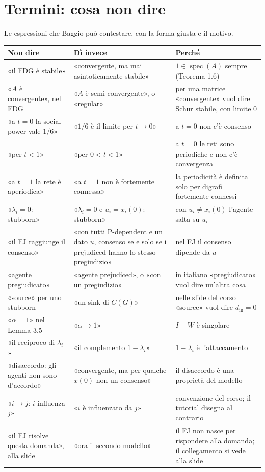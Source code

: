 \documentclass[a4paper,10pt]{article}
\newcommand{\fr}[1]{\getrefnumber{P-#1}}      %
\begin{document}
\section*{Termini: cosa non dire}

Le espressioni che Baggio può contestare, con la forma giusta e il motivo.

\smallskip
{\small
\begin{tabularx}{\textwidth}{>{\raggedright\arraybackslash}p{}>{\raggedright\arraybackslash}p{}>{\raggedright\arraybackslash}X}
  \toprule
  Non dire & Dì invece & Perché \\
  \midrule
  «il FDG è stabile» & «convergente, ma mai asintoticamente stabile» & $1\in\operatorname{spec}(A)$ sempre (Teorema 1.6) \\
  «$A$ è convergente», nel FDG & «$A$ è semi-convergente», o «regular» & per una matrice «convergente» vuol dire Schur stabile, con limite 0 \\
  «a $t=0$ la social power vale $1/6$» & «$1/6$ è il limite per $t\to0$» & a $t=0$ non c'è consenso \\
  «per $t<1$» & «per $0<t<1$» & a $t=0$ le reti sono periodiche e non c'è convergenza \\
  «a $t=1$ la rete è aperiodica» & «a $t=1$ non è fortemente connessa» & la periodicità è definita solo per digrafi fortemente connessi \\
  «$\lambda_i=0$: stubborn» & «$\lambda_i=0$ e $u_i=x_i(0)$: stubborn» & con $u_i\neq x_i(0)$ l'agente salta su $u_i$ \\
  «il FJ raggiunge il consenso» & «con tutti P-dependent e un dato $u$, consenso se e solo se i prejudiced hanno lo stesso pregiudizio» & nel FJ il consenso dipende da $u$ \\
  «agente pregiudicato» & «agente prejudiced», o «con un pregiudizio» & in italiano «pregiudicato» vuol dire un'altra cosa \\
  «source» per uno stubborn & «un sink di $C(G)$» & nelle slide del corso «source» vuol dire $d_{\mathrm{in}}=0$ \\
  «$\alpha=1$» nel Lemma 3.5 & «$\alpha\to1$» & $I-W$ è singolare \\
  «il reciproco di $\lambda_i$» & «il complemento $1-\lambda_i$» & $1-\lambda_i$ è l'attaccamento \\
  «disaccordo: gli agenti non sono d'accordo» & «convergente, ma per qualche $x(0)$ non un consenso» & il disaccordo è una proprietà del modello \\
  «$i\to j$: $i$ influenza $j$» & «$i$ è influenzato da $j$» & convenzione del corso; il tutorial disegna al contrario \\
  «il FJ risolve questa domanda», alla slide \fr{m-bridge} & «ora il secondo modello» & il FJ non nasce per rispondere alla domanda; il collegamento si vede alla slide \fr{m-back-question} \\
  \bottomrule
\end{tabularx}}
\end{document}
